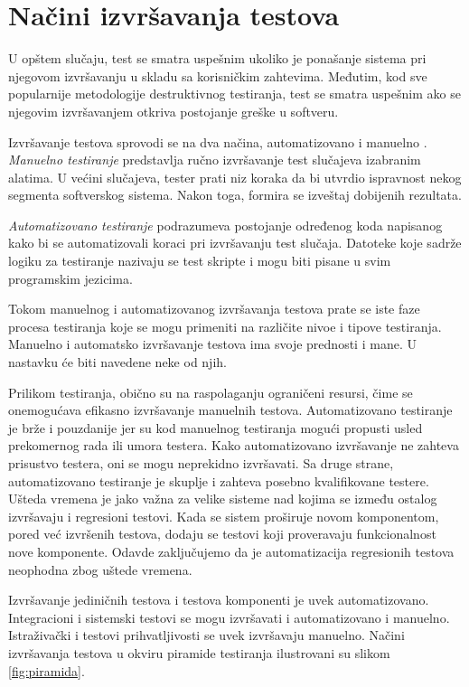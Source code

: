 \documentclass[12pt,oneside]{memoir}
\begin{document}
\section{Načini izvršavanja testova} \label{broj4}
U opštem slučaju, test se smatra uspešnim ukoliko je ponašanje sistema pri njegovom izvršavanju u skladu sa korisničkim zahtevima. Međutim, kod sve popularnije metodologije destruktivnog testiranja, test se smatra uspešnim ako se njegovim izvršavanjem otkriva postojanje greške u softveru.
\par
Izvršavanje testova sprovodi se na dva načina, automatizovano i manuelno \cite{AutomatedManualExecution}. \emph{Manuelno  testiranje} predstavlja ručno izvršavanje test slučajeva izabranim alatima. 
U većini slučajeva, tester prati niz koraka da bi utvrdio ispravnost nekog segmenta softverskog sistema. Nakon toga, formira se izveštaj dobijenih rezultata.
\par
\emph{Automatizovano testiranje} podrazumeva postojanje određenog koda napisanog kako bi se automatizovali koraci pri izvršavanju test slučaja. 
Datoteke koje sadrže logiku za testiranje nazivaju se test skripte i mogu biti pisane u svim programskim jezicima. \par
Tokom manuelnog i automatizovanog izvršavanja testova prate se iste faze procesa testiranja koje se mogu primeniti na različite nivoe i tipove testiranja. Manuelno i automatsko izvršavanje testova ima svoje prednosti i mane. U nastavku će biti navedene neke od njih. 

Prilikom testiranja, obično su na raspolaganju ograničeni resursi, čime se onemogućava efikasno izvršavanje manuelnih testova. Automatizovano testiranje je brže i pouzdanije jer su kod manuelnog testiranja mogući propusti usled prekomernog rada ili umora testera. Kako automatizovano izvršavanje ne zahteva prisustvo testera, oni se mogu neprekidno izvršavati.
Sa druge strane, automatizovano testiranje je skuplje i zahteva posebno kvalifikovane testere. Ušteda vremena je jako važna za velike sisteme nad kojima se između ostalog izvršavaju i regresioni testovi. Kada se sistem proširuje novom komponentom, pored već izvršenih testova, dodaju se testovi koji proveravaju funkcionalnost nove komponente. Odavde zaključujemo da je automatizacija regresionih testova neophodna zbog uštede vremena.

\par
Izvršavanje jediničnih testova i testova komponenti je uvek automatizovano. Integracioni i sistemski testovi se mogu izvršavati i automatizovano i manuelno. Istraživački i testovi prihvatljivosti se uvek izvršavaju manuelno. Načini izvršavanja testova u okviru piramide testiranja ilustrovani su slikom \ref{fig:piramida}.
\end{document}

